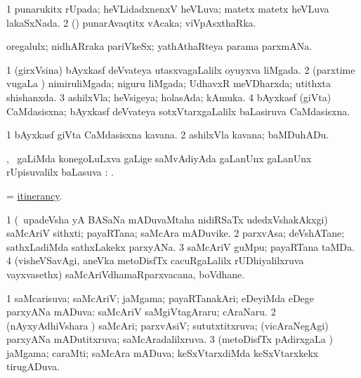 \bentry
{}
\gl{\gu}
\bmng
\bnum
\num{1} punarukitx rUpada; heVLidadxnenxV heVLuva; matetx matetx heVLuva lakaSxNada. 
\num{2} (\vAyx) punarAvaqtitx vAcaka; viVpAsxthaRka. 
\enum
\emng
\eentry

\bentry
{}
\gl{\nA}
\bmng
oregalulx; nidhARraka pariVkeSx; yathAthaRteya parama parxmANa. 
\emng
\eentry

\bentry
{}
\gl{\gu}
\bmng
\bnum
\num{1} (girxVsina) bAyxkasf deVvateya utasxvagaLalilx oyuyxva liMgada. 
\num{2} (parxtime \mo vugaLa \vi) nimiruliMgada; niguru liMgada; UdhavxR meVDharxda; utithxta shishanxda. 
\num{3} ashilxVla; heVsigeya; holasAda; kAmuka. 
\num{4} bAyxkasf (giVta) CaMdasisxna; bAyxkasf deVvateya sotxVtarxgaLalilx baLasiruva CaMdasisxna. 
\enum
\emng
\eentry

\bentry
{}
\gl{\nA}
\bmng
\bnum
\num{1} bAyxkasf giVta CaMdasisxna kavana. 
\num{2} ashilxVla kavana; baMDuhADu. 
\enum
\emng
\eentry

\bentry
{}
\gl{\uparx}
\bmng
{}, \mo\ \uparx gaLiMda konegoLuLxva \nA gaLige saMvAdiyAda \gu gaLanUnx \nA gaLanUnx rUpisuvalilx baLasuva \uparx: . 
\emng
\eentry

\bentry
{}
\gl{\nA}
\bmng
=  \hyperlink{itinerancy}{itinerancy}. 
\emng
\eentry

\bentry
{}
\gl{\nA}
\bmng
\bnum
\num{1} (\kanmu\ upadeVsha yA BASaNa mADuvaMtaha nidiRSaTx udedxVshakAkxgi) saMcAriV sithxti; payaRTana; saMcAra mADuvike. 
\num{2} parxvAsa; deVshATane; sathxLadiMda sathxLakekx parxyANa. 
\num{3} saMcAriV guMpu; payaRTana taMDa. 
\num{4} (visheVSavAgi, aneVka metoDisfTx cacuRgaLalilx rUDhiyalilxruva vayxvasethx) saMcAriVdhamaRparxvacana, boVdhane. 
\enum
\emng
\eentry

\bentry
{}
\gl{\gu}
\bmng
\bnum
\num{1} saMcarisuva; saMcAriV; jaMgama; payaRTanakAri; eDeyiMda eDege parxyANa mADuva:  saMcAriV saMgiVtagAraru; cAraNaru. 
\num{2} (nAyxyAdhiVshara \vi) saMcAri; parxvAsiV; sututxtitxruva; (vicAraNegAgi) parxyANa mADutitxruva; saMcAradalilxruva. 
\num{3} (metoDisfTx pAdirxgaLa \vi) jaMgama; caraMti; saMcAra mADuva; keSxVtarxdiMda keSxVtarxkekx tirugADuva. 
\enum
\emng
\eentry

